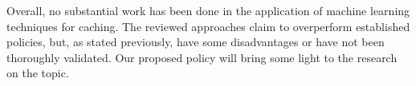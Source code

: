 Overall, no substantial work has been done in the application of machine learning techniques for caching. The reviewed approaches claim to overperform established policies, but, as stated previously, have some disadvantages or have not been thoroughly validated. Our proposed policy will bring some light to the research on the topic.
